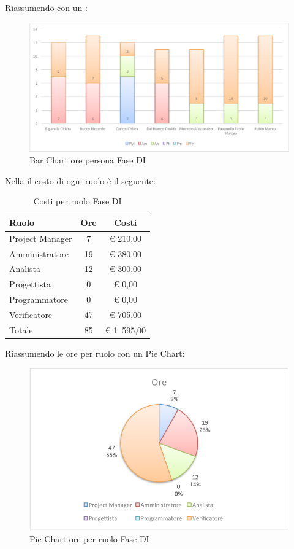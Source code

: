 				Riassumendo con un :
				\begin{figure}[H]\centering
					\includegraphics[width=\textwidth]{PianoDiProgetto/Pics/ChartOreFaseDI.pdf}
					\caption{Bar Chart ore persona Fase DI}
				\end{figure}
				Nella  il costo di ogni ruolo è il seguente:
				\begin{table}[H]
					\begin{center}
						\begin{tabular}{| l | c | c |}
							\hline
							Ruolo 				& Ore 	& Costi  \\ \hline
						
							Project Manager		& 7 	& \euro{} 210,00 	\\
							Amministratore 		& 19 	& \euro{} 380,00 	\\
							Analista	 		& 12 	& \euro{} 300,00 	\\
							Progettista 		& 0		& \euro{} 0,00 		\\
							Programmatore		& 0		& \euro{} 0,00		\\
							Verificatore		& 47 	& \euro{} 705,00 	\\ \hline \hline
							
							Totale	 			& 85 	& \euro{} 1~595,00 	\\ \hline
						\end{tabular}
					\end{center}
					\caption{Costi per ruolo Fase DI}
				\end{table}
				Riassumendo le ore per ruolo con un Pie Chart:
				\begin{figure}[H]\centering
					\includegraphics[width=\textwidth]{PianoDiProgetto/Pics/ChartTotOreFaseDI.pdf}
					\caption{Pie Chart ore per ruolo Fase DI}
				\end{figure}
